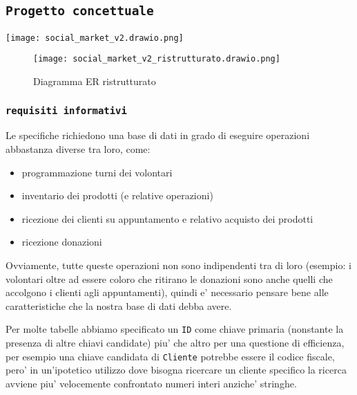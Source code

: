 \documentclass[]{article}
\date{}
\providecommand{\tightlist}{%
  \setlength{\itemsep}{0pt}\setlength{\parskip}{0pt}}
\begin{document}
\hypertarget{progetto-concettuale}{%
\subsection{\texorpdfstring{\texttt{Progetto\ concettuale}}{Progetto concettuale}}\label{progetto-concettuale}}

\texttt{[image: social\_market\_v2.drawio.png]}

\newpage

\begin{figure}
\centering
\texttt{[image: social\_market\_v2\_ristrutturato.drawio.png]}
\caption{Diagramma ER ristrutturato}
\end{figure}

\newpage

\hypertarget{requisiti-informativi}{%
\subsubsection{\texorpdfstring{\texttt{requisiti\ informativi}}{requisiti informativi}}\label{requisiti-informativi}}

Le specifiche richiedono una base di dati in grado di eseguire
operazioni abbastanza diverse tra loro, come:

\begin{itemize}
\tightlist
\item
  programmazione turni dei volontari
\item
  inventario dei prodotti (e relative operazioni)
\item
  ricezione dei clienti su appuntamento e relativo acquisto dei prodotti
\item
  ricezione donazioni
\end{itemize}

Ovviamente, tutte queste operazioni non sono indipendenti tra di loro
(esempio: i volontari oltre ad essere coloro che ritirano le donazioni
sono anche quelli che accolgono i clienti agli appuntamenti), quindi e'
necessario pensare bene alle caratteristiche che la nostra base di dati
debba avere.

Per molte tabelle abbiamo specificato un \texttt{ID} come chiave
primaria (nonstante la presenza di altre chiavi candidate) piu' che
altro per una questione di efficienza, per esempio una chiave candidata
di \texttt{Cliente} potrebbe essere il codice fiscale, pero' in
un'ipotetico utilizzo dove bisogna ricercare un cliente specifico la
ricerca avviene piu' velocemente confrontato numeri interi anziche'
stringhe.
\end{document}
